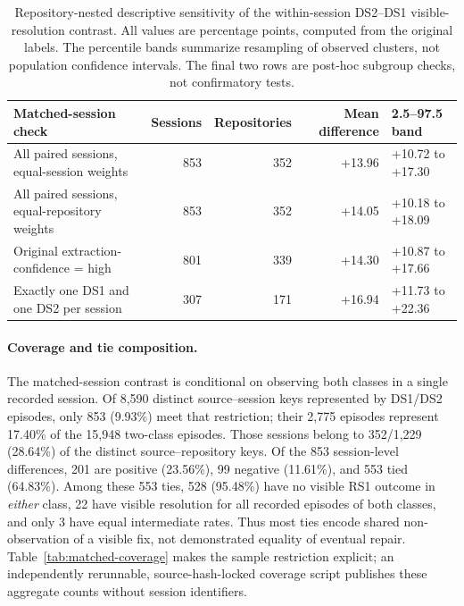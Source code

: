 \begin{table}[htbp]
\centering\small
\caption{Repository-nested descriptive sensitivity of the within-session DS2--DS1 visible-resolution contrast. All values are percentage points, computed from the original labels. The percentile bands summarize resampling of observed clusters, not population confidence intervals. The final two rows are post-hoc subgroup checks, not confirmatory tests.}
\label{tab:nested}
\begin{tabularx}{\textwidth}{@{}YrrrY@{}}
\toprule
\textbf{Matched-session check} & \textbf{Sessions} & \textbf{Repositories} & \textbf{Mean difference} & \textbf{2.5--97.5 band} \\
\midrule
All paired sessions, equal-session weights & 853 & 352 & +13.96 & +10.72 to +17.30 \\
All paired sessions, equal-repository weights & 853 & 352 & +14.05 & +10.18 to +18.09 \\
Original extraction-confidence = high & 801 & 339 & +14.30 & +10.87 to +17.66 \\
Exactly one DS1 and one DS2 per session & 307 & 171 & +16.94 & +11.73 to +22.36 \\
\bottomrule
\end{tabularx}
\end{table}

\paragraph{Coverage and tie composition.} The matched-session contrast is conditional on observing both classes in a single recorded session. Of 8,590 distinct source--session keys represented by DS1/DS2 episodes, only 853 (9.93\%) meet that restriction; their 2,775 episodes represent 17.40\% of the 15,948 two-class episodes. Those sessions belong to 352/1,229 (28.64\%) of the distinct source--repository keys. Of the 853 session-level differences, 201 are positive (23.56\%), 99 negative (11.61\%), and 553 tied (64.83\%). Among these 553 ties, 528 (95.48\%) have no visible RS1 outcome in \emph{either} class, 22 have visible resolution for all recorded episodes of both classes, and only 3 have equal intermediate rates. Thus most ties encode shared non-observation of a visible fix, not demonstrated equality of eventual repair. Table~\ref{tab:matched-coverage} makes the sample restriction explicit; an independently rerunnable, source-hash-locked coverage script publishes these aggregate counts without session identifiers.

